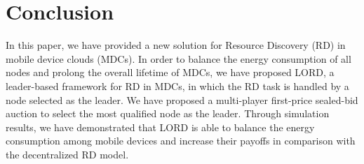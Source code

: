 \documentclass[journal,12pt, onecolumn]{IEEEtran}
\begin{document}
\section{Conclusion}
In this paper, we have provided a new solution for Resource Discovery (RD) in mobile device clouds (MDCs). In order to balance the energy consumption of all nodes and prolong the overall lifetime of MDCs, we have proposed LORD, a leader-based framework for RD in MDCs, in which the RD task is handled by a node selected as the leader. We have proposed a multi-player first-price sealed-bid auction to select the most qualified node as the leader. Through simulation results, we have demonstrated that LORD is able to balance the energy consumption among mobile devices and increase their payoffs in comparison with the decentralized RD model. 
\end{document}
